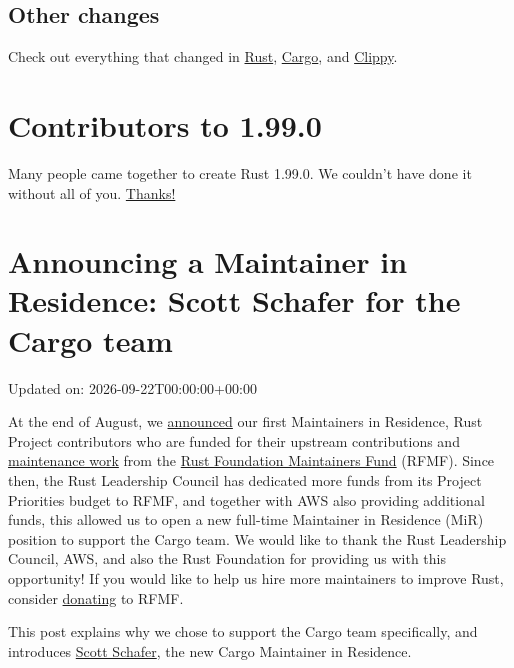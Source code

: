 \documentclass[11pt,a4paper]{article}
\begin{document}
\subsection{Other changes}

Check out everything that changed in \href{https://github.com/rust-lang/rust/releases/tag/1.99.0}{Rust}, \href{https://doc.rust-lang.org/nightly/cargo/CHANGELOG.html\#cargo-199-2026-10-01}{Cargo}, and \href{https://github.com/rust-lang/rust-clippy/blob/master/CHANGELOG.md\#rust-199}{Clippy}.

\section{Contributors to 1.99.0}

Many people came together to create Rust 1.99.0. We couldn't have done it without all of you. \href{https://thanks.rust-lang.org/rust/1.99.0/}{Thanks!}

\section{Announcing a Maintainer in Residence: Scott Schafer for the Cargo team}

Updated on: 2026-09-22T00:00:00+00:00

At the end of August, we \href{https://blog.rust-lang.org/2026/08/26/announcing-our-first-maintainers-in-residence/}{announced} our first Maintainers in Residence, Rust Project contributors who are funded for their upstream contributions and \href{https://blog.rust-lang.org/inside-rust/2026/01/12/what-is-maintenance-anyway/}{maintenance work} from the \href{https://github.com/sponsors/rustfoundation}{Rust Foundation Maintainers Fund} (RFMF). Since then, the Rust Leadership Council has dedicated more funds from its Project Priorities budget to RFMF, and together with AWS also providing additional funds, this allowed us to open a new full-time Maintainer in Residence (MiR) position to support the Cargo team. We would like to thank the Rust Leadership Council, AWS, and also the Rust Foundation for providing us with this opportunity! If you would like to help us hire more maintainers to improve Rust, consider \href{https://github.com/sponsors/rustfoundation}{donating} to RFMF.

This post explains why we chose to support the Cargo team specifically, and introduces \href{https://blog.rust-lang.org/2026/09/22/announcing-a-maintainer-in-residence-scott-schafer-for-the-cargo-team/\#introducing-scott-schafer}{Scott Schafer}, the new Cargo Maintainer in Residence.
\end{document}
